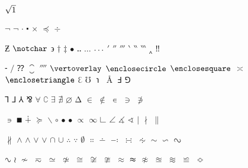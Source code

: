 \documentclass[captions=tableheading]{scrartcl}
\begin{document}
$\sqrtsign{1}$


$\neg$ $\lnot$
$\cdotp$ $\centerdot$
$\times$
$\preceq$
$\div$

$\Zbar$
$\notchar$
$\upbackepsilon$
$\dagger$
$\ddagger$
$\smblkcircle$
$\enleadertwodots$
$\unicodeellipsis$ $\mathellipsis$
$\prime$
$\dprime$
$\trprime$
$\backprime$
$\backdprime$
$\backtrprime$
$\caretinsert$
$\Exclam$

$\hyphenbullet$
$\fracslash$
$\Question$
$\closure$
$\qprime$
$\vertoverlay$
$\enclosecircle$
$\enclosesquare$
$\asymp$
$\enclosetriangle$
$\Eulerconst$
$\mho$
$\turnediota$
$\Angstrom$
$\Finv$
$\Game$

$\sansLturned$
$\sansLmirrored$
$\Yup$
$\upand$
$\forall$
$\complement$
$\exists$
$\nexists$
$\varnothing$
$\increment$
$\in$
$\notin$
$\smallin$
$\ni$
\let\owns=\ni
$\nni$

$\smallni$
$\QED$
$\dotplus$
$\succeq$
$\smallsetminus$
$\vysmwhtcircle$
$\vysmblkcircle$ $\bullet$
$\propto$
$\infty$
$\rightangle$
$\angle$
$\measuredangle$
$\sphericalangle$
$\mid$
$\nmid$
$\parallel$

$\nparallel$
$\wedge$ $\land$
$\vee$ $\lor$
$\cap$
$\cup$
$\therefore$
$\because$
$\emptyset$
$\Colon$
$\dotminus$
$\dashcolon$
$\dotsminusdots$
$\kernelcontraction$
$\sim$
$\backsim$
$\invlazys$

$\sinewave$
$\wr$
$\nsim$
$\eqsim$
$\simeq$
$\nsime$
$\cong$
$\simneqq$
$\ncong$
$\approx$
$\thickapprox$
$\napprox$
$\approxeq$
$\approxident$
$\backcong$
$\Bumpeq$
\end{document}
